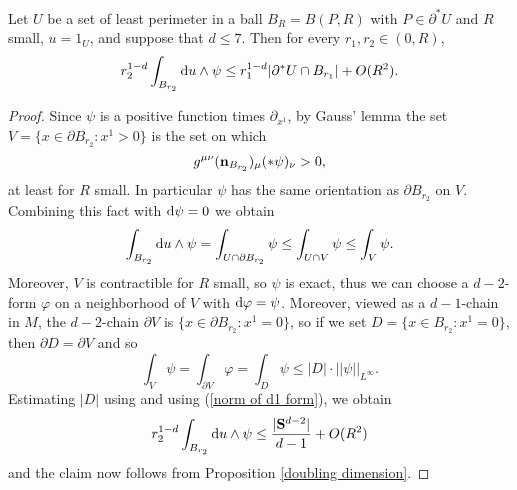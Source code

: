 \begin{proposition}\label{scalar curvature monotonicity}
Let $U$ be a set of least perimeter in a ball $B_R = B(P, R)$ with $P \in \partial^* U$ and $R$ small, $u = 1_U$, and suppose that $d \leq 7$.
Then for every $r_1, r_2 \in (0, R)$,
$$r_2^{1 - d}\int_{B_{r_2}} \mathop{}\!\mathrm{d} u \wedge \psi \leq r_1^{1 - d}|\partial^*U \cap B_{r_1}| + O(R^2).$$
\end{proposition}
\begin{proof}
Since $\psi$ is a positive function times $\partial_{x^1}$, by Gauss' lemma the set $V = \{x \in \partial B_{r_2}: x^1 > 0\}$ is the set on which
$$g^{\mu\nu} (\mathbf n_{B_{r_2}})_\mu (*\psi)_\nu > 0,$$
at least for $R$ small.
In particular $\psi$ has the same orientation as $\partial B_{r_2}$ on $V$. Combining this fact with $\mathop{}\!\mathrm{d} \psi = 0$ we obtain
$$\int_{B_{r_2}} \mathop{}\!\mathrm{d} u \wedge \psi = \int_{U \cap \partial B_{r_2}} \psi \leq \int_{U \cap V} \psi \leq \int_V \psi.$$
Moreover, $V$ is contractible for $R$ small, so $\psi$ is exact, thus we can choose a $d-2$-form $\varphi$ on a neighborhood of $V$ with $\mathop{}\!\mathrm{d} \varphi = \psi$.
Moreover, viewed as a $d-1$-chain in $M$, the $d-2$-chain $\partial V$ is $\{x \in \partial B_{r_2}: x^1 = 0\}$, so if we set $D = \{x \in B_{r_2}: x^1 = 0\}$, then $\partial D = \partial V$ and so
$$\int_V \psi = \int_{\partial V} \varphi = \int_D \psi \leq |D| \cdot ||\psi||_{L^\infty}.$$
Estimating $|D|$ using \cite{gray1974volume} and using (\ref{norm of d1 form}), we obtain
$$r_2^{1 - d} \int_{B_{r_2}} \mathop{}\!\mathrm{d} u \wedge \psi \leq \frac{|\mathbf S^{d - 2}|}{d - 1} + O(R^2)$$
and the claim now follows from Proposition \ref{doubling dimension}.
\end{proof}